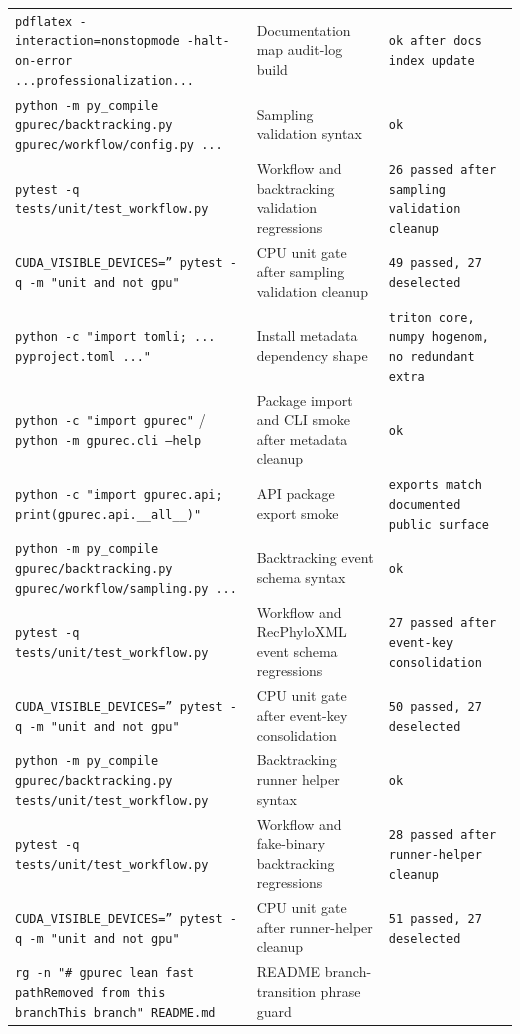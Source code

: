 \documentclass[11pt]{article}
\begin{document}
\begin{center}
\begin{tabular}{lll}
\texttt{pdflatex -interaction=nonstopmode -halt-on-error ...professionalization...} &
Documentation map audit-log build &
\texttt{ok after docs index update} \\
\texttt{python -m py\_compile gpurec/backtracking.py gpurec/workflow/config.py ...} &
Sampling validation syntax &
\texttt{ok} \\
\texttt{pytest -q tests/unit/test\_workflow.py} &
Workflow and backtracking validation regressions &
\texttt{26 passed after sampling validation cleanup} \\
\texttt{CUDA\_VISIBLE\_DEVICES='' pytest -q -m "unit and not gpu"} &
CPU unit gate after sampling validation cleanup &
\texttt{49 passed, 27 deselected} \\
\texttt{python -c "import tomli; ... pyproject.toml ..."} &
Install metadata dependency shape &
\texttt{triton core, numpy hogenom, no redundant extra} \\
\texttt{python -c "import gpurec"} / \texttt{python -m gpurec.cli --help} &
Package import and CLI smoke after metadata cleanup &
\texttt{ok} \\
\texttt{python -c "import gpurec.api; print(gpurec.api.\_\_all\_\_)"} &
API package export smoke &
\texttt{exports match documented public surface} \\
\texttt{python -m py\_compile gpurec/backtracking.py gpurec/workflow/sampling.py ...} &
Backtracking event schema syntax &
\texttt{ok} \\
\texttt{pytest -q tests/unit/test\_workflow.py} &
Workflow and RecPhyloXML event schema regressions &
\texttt{27 passed after event-key consolidation} \\
\texttt{CUDA\_VISIBLE\_DEVICES='' pytest -q -m "unit and not gpu"} &
CPU unit gate after event-key consolidation &
\texttt{50 passed, 27 deselected} \\
\texttt{python -m py\_compile gpurec/backtracking.py tests/unit/test\_workflow.py} &
Backtracking runner helper syntax &
\texttt{ok} \\
\texttt{pytest -q tests/unit/test\_workflow.py} &
Workflow and fake-binary backtracking regressions &
\texttt{28 passed after runner-helper cleanup} \\
\texttt{CUDA\_VISIBLE\_DEVICES='' pytest -q -m "unit and not gpu"} &
CPU unit gate after runner-helper cleanup &
\texttt{51 passed, 27 deselected} \\
\texttt{rg -n "\# gpurec lean fast path\textbar{}Removed from this branch\textbar{}This branch" README.md} &
README branch-transition phrase guard &

\end{tabular}
\end{center}
\end{document}

